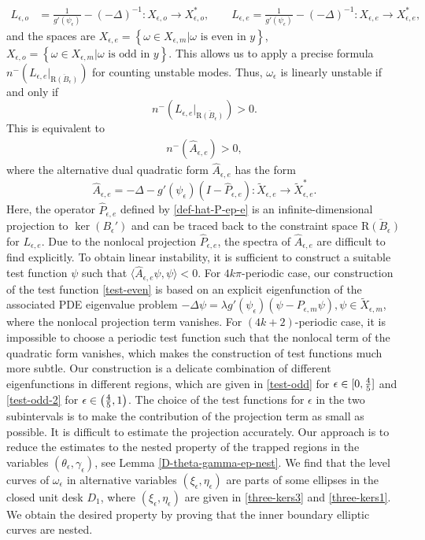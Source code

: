 \documentclass[1 [leqno, 11pt]{amsart}
\numberwithin{equation}{section}
\let\ep=\epsilon
\begin{document}
\begin{CJK*}{GBK}{song}
\begin{align*}
 L_{\ep,o} &= \frac{1}{g'(\psi_\ep)} - (-\Delta)^{-1}: X_{\ep, o} \rightarrow X_{\ep, o}^*, \quad\quad
 L_{\ep,e} = \frac{1}{g'(\psi_\ep)} - (-\Delta)^{-1}: X_{\ep, e} \rightarrow X_{\ep, e}^*,
 \end{align*}
and the spaces are $X_{\ep, e} = \left\{ \omega \in X_{\ep,m} | \omega \text{ is even in }y \right\}$,
$X_{\ep, o} = \left\{ \omega \in X_{\ep,m} | \omega \text{ is odd in }y \right\}.$
This allows us to apply a precise  formula $n^-\left(L_{\ep,e}|_{\overline{\text{R}(B_\ep)}}\right)$ for counting unstable modes. Thus, $\omega_\ep$ is linearly unstable if and only if $$n^-\left(L_{\ep,e}|_{\overline{\text{R}(B_\ep)}}\right)>0.$$
This is equivalent to
\begin{align}\label{multi-periodic instabilibity criterion intruduction}
 n^-\left(\hat{A}_{\ep,e}\right)>0,
\end{align}
where  the  alternative dual quadratic form $\hat{A}_{\ep,e}$ has the form
$$\hat{A}_{\ep,e} = - \Delta - g'(\psi_\ep)(I - \hat{P}_{\ep,e}): \tilde{X}_{\ep, e} \rightarrow \tilde{X}^*_{\ep, e}.$$
Here, the operator $\hat{P}_{\ep,e}$   defined by \eqref{def-hat-P-ep-e} is an  infinite-dimensional projection to $\ker (B_\ep')$ and can be traced back to the constraint space $\overline{\text{R}(B_\ep)}$ for $L_{\ep,e}$.
Due to the  nonlocal  projection $\hat{P}_{\ep,e}$, the spectra of $\hat{A}_{\ep,e}$  are difficult to find explicitly.
To obtain linear instability, it is sufficient to construct a suitable test function $\psi$ such that  $\langle\hat{A}_{\ep,e}\psi,\psi\rangle<0$. For $4k\pi$-periodic case, our construction of the test function \eqref{test-even} is based on an explicit
 eigenfunction of the associated PDE eigenvalue problem $-\Delta \psi = \lambda g'(\psi_\ep)(\psi -  P_{\ep,m}\psi),  \psi \in \tilde{X}_{\ep,m}$, where  the nonlocal projection term vanishes. For  $(4k+2)$-periodic case,
it is impossible to choose a periodic test function such that the nonlocal term of the quadratic form vanishes, which makes the construction of test functions  much more subtle.
Our construction is a delicate combination of different eigenfunctions in different regions, which are given in \eqref{test-odd} for $\ep\in[0,{4\over5}]$ and \eqref{test-odd-2} for $\ep\in\left({4\over5},1\right)$. The choice of the test functions for $\ep$ in the two subintervals is to make the contribution of the projection term as small as possible. It is difficult to estimate the projection accurately. Our approach is to reduce the estimates to the nested property of the trapped regions in the variables $(\theta_\ep,\gamma_\ep)$, see Lemma \ref{D-theta-gamma-ep-nest}. We find that the level curves of $\omega_\ep$ in  alternative variables $(\xi_\ep,\eta_\ep)$ are parts of some ellipses in the closed unit desk $D_1$, where $(\xi_\ep,\eta_\ep)$ are given in \eqref{three-kers3} and \eqref{three-kers1}. We obtain the desired property by proving that the inner boundary elliptic curves are nested.


\end{CJK*}
\end{document}
